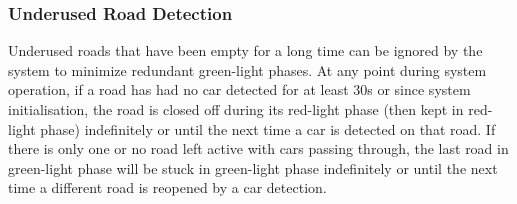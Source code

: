 \subsubsection{Underused Road Detection}
Underused roads that have been empty for a long time can be ignored by the system to minimize redundant green-light phases. At any point during system operation, if a road has had no car detected for at least 30\unit{\second} or since system initialisation, the road is closed off during its red-light phase (then kept in red-light phase) indefinitely or until the next time a car is detected on that road. If there is only one or no road left active with cars passing through, the last road in green-light phase will be stuck in green-light phase indefinitely or until the next time a different road is reopened by a car detection.